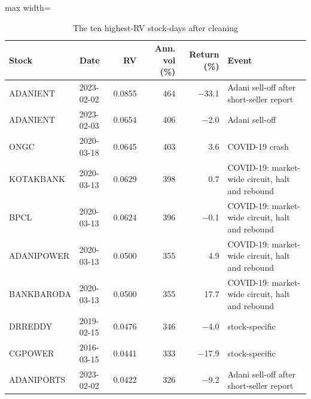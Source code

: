 \begin{table}[H]
\centering
\caption{The ten highest-RV stock-days after cleaning}
\label{tab:topdays}
\small
\begin{adjustbox}{max width=\textwidth}
\begin{tabular}{llrrrl}
\toprule
Stock & Date & RV & Ann. vol (\%) & Return (\%) & Event \\
\midrule
ADANIENT & 2023-02-02 & 0.0855 & 464 & $-$33.1 & Adani sell-off after short-seller report \\
ADANIENT & 2023-02-03 & 0.0654 & 406 & $-$2.0 & Adani sell-off \\
ONGC & 2020-03-18 & 0.0645 & 403 & 3.6 & COVID-19 crash \\
KOTAKBANK & 2020-03-13 & 0.0629 & 398 & 0.7 & COVID-19: market-wide circuit, halt and rebound \\
BPCL & 2020-03-13 & 0.0624 & 396 & $-$0.1 & COVID-19: market-wide circuit, halt and rebound \\
ADANIPOWER & 2020-03-13 & 0.0500 & 355 & 4.9 & COVID-19: market-wide circuit, halt and rebound \\
BANKBARODA & 2020-03-13 & 0.0500 & 355 & 17.7 & COVID-19: market-wide circuit, halt and rebound \\
DRREDDY & 2019-02-15 & 0.0476 & 346 & $-$4.0 & stock-specific \\
CGPOWER & 2016-03-15 & 0.0441 & 333 & $-$17.9 & stock-specific \\
ADANIPORTS & 2023-02-02 & 0.0422 & 326 & $-$9.2 & Adani sell-off after short-seller report \\
\bottomrule
\end{tabular}
\end{adjustbox}
\end{table}
